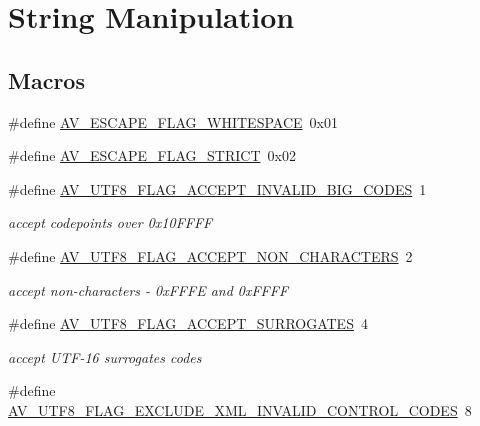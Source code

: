 \hypertarget{group__lavu__string}{}\section{String Manipulation}
\label{group__lavu__string}
\subsection*{Macros}
\begin{DoxyCompactItemize}
\item 
\#define \hyperlink{group__lavu__string_ga84ac09ffcff9c3c42c35db1f8477cc17}{A\+V\+\_\+\+E\+S\+C\+A\+P\+E\+\_\+\+F\+L\+A\+G\+\_\+\+W\+H\+I\+T\+E\+S\+P\+A\+CE}~0x01
\item 
\#define \hyperlink{group__lavu__string_ga24963cc06a1b89194ba8a2fe013a7d7d}{A\+V\+\_\+\+E\+S\+C\+A\+P\+E\+\_\+\+F\+L\+A\+G\+\_\+\+S\+T\+R\+I\+CT}~0x02
\item 
\#define \hyperlink{group__lavu__string_ga61b431e73b72949c839788914a599207}{A\+V\+\_\+\+U\+T\+F8\+\_\+\+F\+L\+A\+G\+\_\+\+A\+C\+C\+E\+P\+T\+\_\+\+I\+N\+V\+A\+L\+I\+D\+\_\+\+B\+I\+G\+\_\+\+C\+O\+D\+ES}~1
\begin{DoxyCompactList}\small\item\em accept codepoints over 0x10\+F\+F\+FF \end{DoxyCompactList}\item 
\#define \hyperlink{group__lavu__string_gadc5f344d3eafe34e9c3169b1178e137b}{A\+V\+\_\+\+U\+T\+F8\+\_\+\+F\+L\+A\+G\+\_\+\+A\+C\+C\+E\+P\+T\+\_\+\+N\+O\+N\+\_\+\+C\+H\+A\+R\+A\+C\+T\+E\+RS}~2
\begin{DoxyCompactList}\small\item\em accept non-\/characters -\/ 0x\+F\+F\+FE and 0x\+F\+F\+FF \end{DoxyCompactList}\item 
\#define \hyperlink{group__lavu__string_ga39a93e11907ca4b116d8d179cbdb570d}{A\+V\+\_\+\+U\+T\+F8\+\_\+\+F\+L\+A\+G\+\_\+\+A\+C\+C\+E\+P\+T\+\_\+\+S\+U\+R\+R\+O\+G\+A\+T\+ES}~4
\begin{DoxyCompactList}\small\item\em accept U\+T\+F-\/16 surrogates codes \end{DoxyCompactList}\item 
\#define \hyperlink{group__lavu__string_gaecaf936b2eb2f3c410869e235650229b}{A\+V\+\_\+\+U\+T\+F8\+\_\+\+F\+L\+A\+G\+\_\+\+E\+X\+C\+L\+U\+D\+E\+\_\+\+X\+M\+L\+\_\+\+I\+N\+V\+A\+L\+I\+D\+\_\+\+C\+O\+N\+T\+R\+O\+L\+\_\+\+C\+O\+D\+ES}~8

\end{DoxyCompactItemize}
